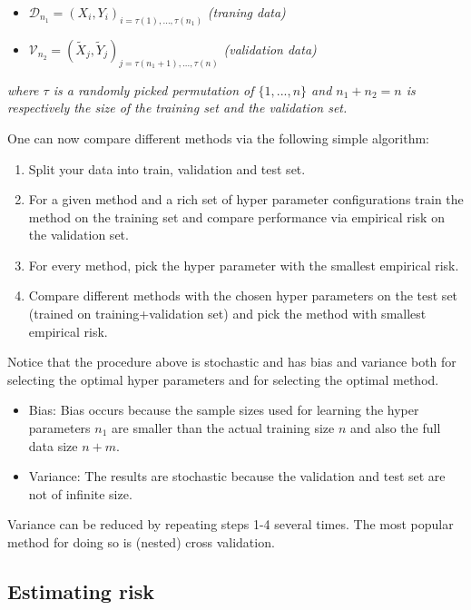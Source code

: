 \documentclass[a4paper,12pt,openany]{book}
\providecommand{\tightlist}{%
 \setlength{\itemsep}{0pt}\setlength{\parskip}{0pt}}
\begin{document}
\begin{itemize}
\tightlist
\item
  \(\mathcal{D}_{n_1}=(X_i,Y_i)_{i=\tau(1),...,\tau(n_1)}\) \emph{(traning data)}
\item
  \(\mathcal{V}_{n_2}=(\tilde{X}_j,\tilde{Y}_j)_{j=\tau(n_1+1),...,\tau(n)}\) \emph{(validation data)}
\end{itemize}

\emph{where \(\tau\) is a randomly picked permutation of \(\{1,...,n\}\) and \(n_1+n_2=n\) is respectively the size of the training set and the validation set.}

One can now compare different methods via the following simple algorithm:

\begin{enumerate}
\def\labelenumi{\arabic{enumi}.}
\tightlist
\item
  Split your data into train, validation and test set.
\item
  For a given method and a rich set of hyper parameter configurations train the method on the training set and compare performance via empirical risk on the validation set.
\item
  For every method, pick the hyper parameter with the smallest empirical risk.
\item
  Compare different methods with the chosen hyper parameters on the test set (trained on training+validation set) and pick the method with smallest empirical risk.
\end{enumerate}

Notice that the procedure above is stochastic and has bias and variance both for selecting the optimal hyper parameters and for selecting the optimal method.

\begin{itemize}
\tightlist
\item
  Bias: Bias occurs because the sample sizes used for learning the hyper parameters \(n_1\) are smaller than the actual training size \(n\) and also the full data size \(n+m\).
\item
  Variance: The results are stochastic because the validation and test set are not of infinite size.
\end{itemize}

Variance can be reduced by repeating steps 1-4 several times. The most popular method for doing so is (nested) cross validation.

\hypertarget{estimating-risk}{%
\subsection{Estimating risk}\label{estimating-risk}}
\end{document}

